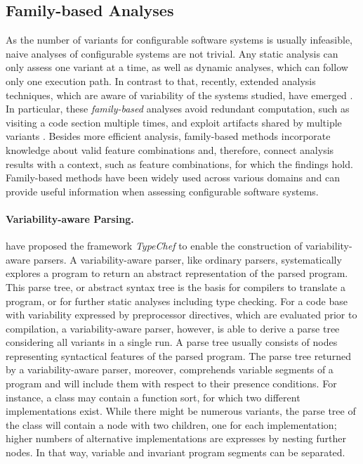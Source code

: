 \subsection{Family-based Analyses}
As the number of variants for configurable software systems is usually
infeasible, naive analyses of configurable systems are not trivial. Any static
analysis can only assess one variant at a time, as well as dynamic analyses,
which can follow only one execution path. 
In contrast to that, recently,
extended analysis techniques, which are aware of variability of the systems
studied, have emerged \citep{thum_classification_2014}. In particular, these
\emph{family-based} analyses avoid redundant computation, such as visiting a
code section multiple times, and exploit artifacts shared by multiple variants
\citep{thum_classification_2014}. Besides more efficient analysis, family-based
methods incorporate knowledge about valid feature combinations
\citep{thum_classification_2014} and, therefore, connect analysis results with
a context, such as feature combinations, for which the findings hold.
Family-based methods have been widely used across various domains and can
provide useful information when assessing configurable software systems.

\paragraph{Variability-aware Parsing.} \cite{kastner_variability-aware_2011}
have proposed the framework \emph{TypeChef} to enable the construction of
variability-aware parsers. A variability-aware parser, like ordinary parsers,
systematically explores a program to return an abstract representation of the
parsed program. This parse tree, or abstract syntax tree
is the basis for compilers to translate a program, or for further static
analyses including type checking. For a code base with variability expressed by
preprocessor directives, which are evaluated prior to compilation, a
variability-aware parser, however, is able to derive a parse tree considering
all variants in a single run. A parse tree usually consists of nodes
representing syntactical features of the parsed program. The parse tree
returned by a variability-aware parser, moreover, comprehends variable segments
of a program and will include them with respect to their presence conditions.
For instance, a class may contain a function sort, for which two different
implementations exist. While there might be numerous variants, the parse tree
of the class will contain a node with two children, one for each
implementation; higher numbers of alternative implementations are expresses by
nesting further nodes. In that way, variable and invariant program segments
can be separated.

